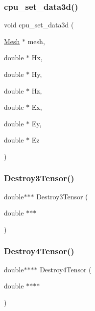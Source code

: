 \mbox{\label{a00554_a55829c497e26c6b3a96d50b085abda9c}} 
\subsubsection{\texorpdfstring{cpu\+\_\+set\+\_\+data3d()}{cpu\_set\_data3d()}}
{\footnotesize\ttfamily void cpu\+\_\+set\+\_\+data3d (\begin{DoxyParamCaption}\item[{\hyperlink{a00557_aeffbe0891ab73a4d8964c9cb7978426e}{Mesh} $\ast$}]{mesh,  }\item[{double $\ast$}]{Hx,  }\item[{double $\ast$}]{Hy,  }\item[{double $\ast$}]{Hz,  }\item[{double $\ast$}]{Ex,  }\item[{double $\ast$}]{Ey,  }\item[{double $\ast$}]{Ez }\end{DoxyParamCaption})}

\mbox{\label{a00554_a51bb9f1cde4263ba91387d1c20dcf8c7}} 
\subsubsection{\texorpdfstring{Destroy3\+Tensor()}{Destroy3Tensor()}}
{\footnotesize\ttfamily double$\ast$$\ast$$\ast$ Destroy3\+Tensor (\begin{DoxyParamCaption}\item[{double $\ast$$\ast$$\ast$}]{ }\end{DoxyParamCaption})}

\mbox{\label{a00554_a04367038e0614f8f3a881b057048d009}} 
\subsubsection{\texorpdfstring{Destroy4\+Tensor()}{Destroy4Tensor()}}
{\footnotesize\ttfamily double$\ast$$\ast$$\ast$$\ast$ Destroy4\+Tensor (\begin{DoxyParamCaption}\item[{double $\ast$$\ast$$\ast$$\ast$}]{ }\end{DoxyParamCaption})}


